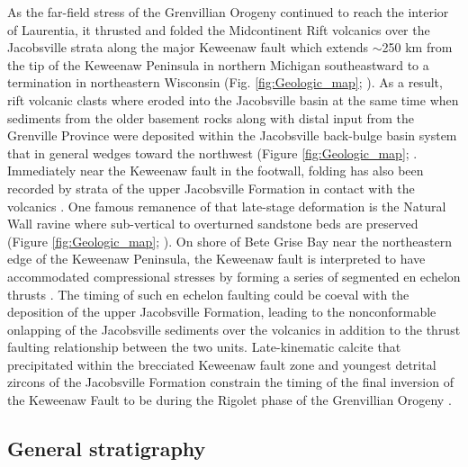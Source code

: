 \documentclass[draft]{agujournal2019}
\begin{document}
As the far-field stress of the Grenvillian Orogeny continued to reach the interior of Laurentia, it thrusted and folded the Midcontinent Rift volcanics over the Jacobsville strata along the major Keweenaw fault which extends $\sim$250 km from the tip of the Keweenaw Peninsula in northern Michigan southeastward to a termination in northeastern Wisconsin (Fig. \ref{fig:Geologic_map}; ). As a result, rift volcanic clasts where eroded into the Jacobsville basin at the same time when sediments from the older basement rocks along with distal input from the Grenville Province were deposited within the Jacobsville back-bulge basin system that in general wedges toward the northwest (Figure \ref{fig:Geologic_map}; \cite{Hedgman2014a, Hodgin2022a}. Immediately near the Keweenaw fault in the footwall, folding has also been recorded by strata of the upper Jacobsville Formation in contact with the volcanics \cite{Cannon1993a}. One famous remanence of that late-stage deformation is the Natural Wall ravine where sub-vertical to overturned sandstone beds are preserved (Figure \ref{fig:Geologic_map}; \cite{Hamblin1958a}). On shore of Bete Grise Bay near the northeastern edge of the Keweenaw Peninsula, the Keweenaw fault is interpreted to have accommodated compressional stresses by forming a series of segmented en echelon thrusts \cite{Tyrrell2019a}. The timing of such en echelon faulting could be coeval with the deposition of the upper Jacobsville Formation, leading to the nonconformable onlapping of the Jacobsville sediments over the volcanics in addition to the thrust faulting relationship between the two units. Late-kinematic calcite that precipitated within the brecciated Keweenaw fault zone and youngest detrital zircons of the Jacobsville Formation constrain the timing of the final inversion of the Keweenaw Fault to be during the Rigolet phase of the Grenvillian Orogeny \cite{Hodgin2022a}. 

\subsection{General stratigraphy}
\end{document}
